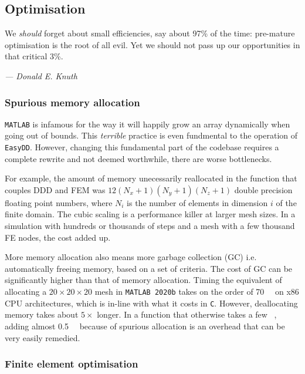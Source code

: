 \subsection{Optimisation}
\renewcommand{\epigraphflush}{flushright}
\renewcommand{\textflush}{flushright}
\setlength{\epigraphwidth}{0.75\linewidth}
\epigraph{We \emph{should} forget about small efficiencies, say about 97\% of the time: pre-mature optimisation is the root of all evil. Yet we should not pass up our opportunities in that critical 3\%.}{\textit{--- Donald E. Knuth \cite[p.~268]{knuth1974structured}}}

\subsubsection{Spurious memory allocation}

\texttt{MATLAB} is infamous for the way it will happily grow an array dynamically when going out of bounds. This \emph{terrible} practice is even fundmental to the operation of \texttt{EasyDD}. However, changing this fundamental part of the codebase requires a complete rewrite and not deemed worthwhile, there are worse bottlenecks.

For example, the amount of memory unecessarily reallocated in the function that couples DDD and FEM was $12(N_x + 1)(N_y + 1)(N_z + 1)$ double precision floating point numbers, where $N_i$ is the number of elements in dimension $i$ of the finite domain. The cubic scaling is a performance killer at larger mesh sizes. In a simulation with hundreds or thousands of steps and a mesh with a few thousand FE nodes, the cost added up.

More memory allocation also means more garbage collection (GC) \cite{hanson1990fast} i.e. automatically freeing memory, based on a set of criteria. The cost of GC can be significantly higher than that of memory allocation. Timing the equivalent of allocating a $20 \times 20 \times 20$ mesh in \texttt{MATLAB 2020b} takes on the order of \SI{70}{\micro\sec} on x86 CPU architectures, which is in-line with what it costs in \texttt{C}. However, deallocating memory takes about $5 \times$ longer. In a function that otherwise takes a few \si{\milli\sec}, adding almost \SI{0.5}{\milli\sec} because of spurious allocation is an overhead that can be very easily remedied.

\subsubsection{Finite element optimisation}

